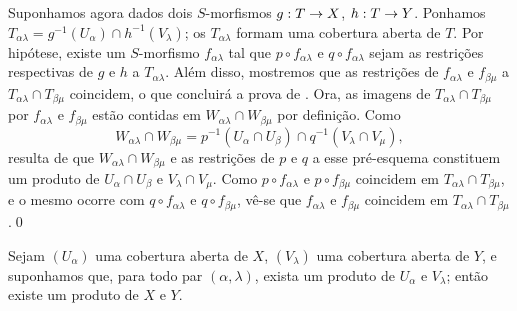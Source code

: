 \documentclass[oneside]{amsart}
\makeatletter
\newcommand{\ega@arrow}[2]{\mathchoice{#1}{#2}{#2}{#2}}
\renewcommand{\to}{\ega@arrow{\longrightarrow}{\rightarrow}}
\newcommand{\oldpage}[2][]{{\marginnote{\normalfont\textbf{#1}~|~#2}}\ignorespaces}
\let\EGAOriginalLabel\label
\renewcommand{\label}[1]{\phantomsection\EGAOriginalLabel{#1}}
\makeatother
\begin{document}
Suponhamos agora dados dois $S$-morfismos $g:T\to X$, $h:T\to Y$. Ponhamos
$T_{\alpha\lambda}=g^{-1}(U_\alpha)\cap h^{-1}(V_\lambda)$; os
$T_{\alpha\lambda}$ formam uma cobertura aberta de $T$. Por hipótese, existe
um $S$-morfismo $f_{\alpha\lambda}$ tal que $p\circ f_{\alpha\lambda}$ e
$q\circ f_{\alpha\lambda}$ sejam as restrições respectivas de $g$ e $h$ a
$T_{\alpha\lambda}$. Além disso, mostremos que as restrições de
$f_{\alpha\lambda}$ e $f_{\beta\mu}$ a
$T_{\alpha\lambda}\cap T_{\beta\mu}$ coincidem, o que concluirá a prova de
. Ora, as imagens de
$T_{\alpha\lambda}\cap T_{\beta\mu}$ por $f_{\alpha\lambda}$ e
$f_{\beta\mu}$ estão contidas em $W_{\alpha\lambda}\cap W_{\beta\mu}$ por
definição. Como
\[
  W_{\alpha\lambda}\cap W_{\beta\mu}
  =p^{-1}(U_\alpha\cap U_\beta)\cap
   q^{-1}(V_\lambda\cap V_\mu),
\]
resulta de  que
$W_{\alpha\lambda}\cap W_{\beta\mu}$ e as restrições de $p$ e $q$ a esse
pré-esquema constituem um produto de $U_\alpha\cap U_\beta$ e
$V_\lambda\cap V_\mu$. Como $p\circ f_{\alpha\lambda}$ e
$p\circ f_{\beta\mu}$ coincidem em
$T_{\alpha\lambda}\cap T_{\beta\mu}$, e o mesmo ocorre com
$q\circ f_{\alpha\lambda}$ e $q\circ f_{\beta\mu}$, vê-se que
$f_{\alpha\lambda}$ e $f_{\beta\mu}$ coincidem em
$T_{\alpha\lambda}\cap T_{\beta\mu}$.\qed

\oldpage[I]{107}
\begin{lemma}[3.2.6.3]
\label{I.3.2.6.3}
Sejam $(U_\alpha)$ uma cobertura aberta de $X$, $(V_\lambda)$ uma cobertura
aberta de $Y$, e suponhamos que, para todo par $(\alpha,\lambda)$, exista um
produto de $U_\alpha$ e $V_\lambda$; então existe um produto de $X$ e $Y$.
\end{lemma}
\end{document}
